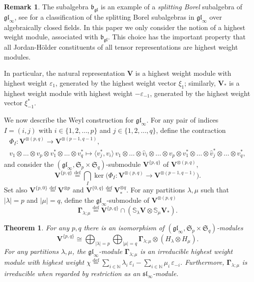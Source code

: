 \documentclass[12pt,reqno]{amsart}
\numberwithin{equation}{section}
\theoremstyle{plain}
\newtheorem{thm}{Theorem}[section]
\theoremstyle{definition}
\newtheorem{rem}{Remark}
\def\N{\mathbb N}
\def\eps{\varepsilon}
\def\bydef{\overset{\mathrm {def}}=}
\def\gl{\mathfrak{gl}}
\def\sl{\mathfrak{sl}}
\def\o{\otimes}
\def\b{\mathfrak b}
\def\glV_#1{\boldsymbol\Gamma_{#1}}
\def\SS{\mathbb S}
\def\VV{\mathbf V}
\def\<{\langle}
\def\>{\rangle}
\begin{document}
\begin{rem}
The subalgebra $\b_\gl$ is an example of a {\it splitting Borel}
subalgebra of $\gl_\infty$, see \cite{DP2} for a classification of
the splitting Borel subalgebras in $\gl_\infty$ over algebraically
closed fields. In this paper we only consider the notion of a highest
weight module, associated with $\b_\gl$. This choice has the important property
that all Jordan-H\"older constituents of all tensor representations
are highest weight modules.
\end{rem}

In particular, the natural representation $\VV$ is a highest weight
module with highest weight $\eps_1$, generated by the highest weight
vector $\xi_1$; similarly, $\VV_*$ is a highest weight module with highest 
weight $-\eps_{-1}$, generated by the highest weight vector $\xi_{-1}^*$.

\medskip

We now describe the Weyl construction for $\gl_\infty$. For any pair
of indices $I = (i,j)$ with $i\in\{1,2,\dots,p\}$ and
$j\in\{1,2,\dots,q\}$, define the contraction
\begin{equation*}
\begin{gathered}
    \Phi_{I}: \VV^{\o (p,q)} \to \VV^{\o (p-1,q-1)},\\
    v_1 \o\dots\o v_p \o v^*_1 \o\dots\o v^*_q \mapsto \<v_{j}^*,v_{i}\> \, v_1 \o \dots \o \hat
    v_{i} \o \dots\o v_p \o v^*_1 \o\dots\o \hat v_{j}^* \o \dots \o v_q^*,
\end{gathered}
\end{equation*}
and consider the $(\gl_\infty, \mathfrak S_p \times \mathfrak
S_q)$-submodule $\VV^{\{p,q\}}$ of $\VV^{\o (p,q)}$,
\begin{equation*}
    \VV^{\{p,q\}} \bydef \bigcap_{I} \ker
    \biggr( \Phi_{I}: \VV^{\o(p,q)} \to
    \VV^{\o(p-1,q-1)}\biggr).
\end{equation*}
Set also $\VV^{\{p,0\}} \bydef \VV^{\o p}$ and $\VV^{\{0,q\}}
\bydef \VV_*^{\o q}$. For any partitions $\lambda,\mu$ such that
$|\lambda|=p$ and $|\mu|=q$, define the $\gl_\infty$-submodule of
$\VV^{\o(p,q)}$
\begin{equation*}
    \glV_{\lambda;\mu} \bydef  \VV^{ \{p,q\} } \cap (\SS_\lambda \VV \o \SS_\mu \VV_*).
\end{equation*}

\medskip

\begin{thm}\label{thm:mixed Schur-Weyl infinite}
For any $p,q$ there is an isomorphism of $(\gl_\infty, \mathfrak S_p
\times \mathfrak S_q)$-modules
\begin{equation}\label{eq:mixed Schur-Weyl infinite}
    \VV^{\{p,q\}} \cong \bigoplus_{|\lambda|=p} \bigoplus_{|\mu| = q}
    \glV_{\lambda;\mu} \o (H_\lambda \o H_\mu).
\end{equation}
For any partitions $\lambda,\mu$, the $\gl_\infty$-module
$\glV_{\lambda;\mu}$ is an irreducible highest weight module with
highest weight $\chi \bydef \sum_{i \in \N} \lambda_i \, \eps_i - \sum_{i
\in \N} \mu_i \, \eps_{-i}$. Furthermore, $\glV_{\lambda;\mu}$ is
irreducible when regarded by restriction as an $\sl_\infty$-module.
\end{thm}
\end{document}
